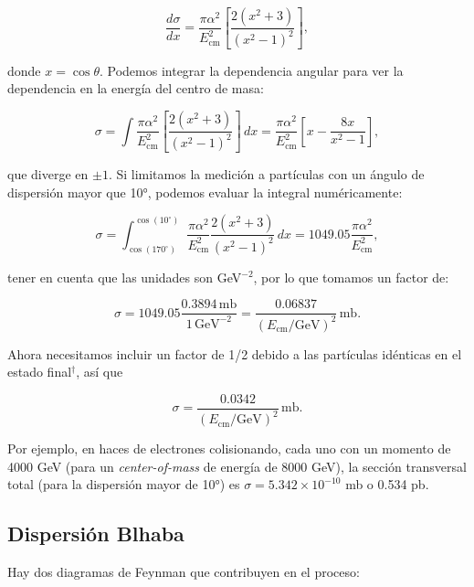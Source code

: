 \begin{equation}
\frac{d\sigma}{dx} = \frac{\pi \alpha^2}{E_{\text{cm}}^2} \left[ \frac{2 (x^2 + 3)}{(x^2 - 1)^2} \right],
\end{equation}

donde $x = \cos \theta$. Podemos integrar la dependencia angular para ver la dependencia en la energía del centro de masa:

\begin{equation}
\sigma = \int \frac{\pi \alpha^2}{E_{\text{cm}}^2} \left[ \frac{2 (x^2 + 3)}{(x^2 - 1)^2} \right] \, dx = \frac{\pi \alpha^2}{E_{\text{cm}}^2} \left[ x - \frac{8x}{x^2 - 1} \right],
\end{equation}

que diverge en $\pm 1$. Si limitamos la medición a partículas con un ángulo de dispersión mayor que 10°, podemos evaluar la integral numéricamente:

\begin{equation}
\sigma = \int_{\cos(170^\circ)}^{\cos(10^\circ)} \frac{\pi \alpha^2}{E_{\text{cm}}^2} \frac{2 (x^2 + 3)}{(x^2 - 1)^2} \, dx = 1049.05 \frac{\pi \alpha^2}{E_{\text{cm}}^2},
\end{equation}

tener en cuenta que las unidades son GeV$^{-2}$, por lo que tomamos un factor de:

\begin{equation}
\sigma = 1049.05 \frac{0.3894 \, \text{mb}}{1 \, \text{GeV}^{-2}} = \frac{0.06837}{(E_{\text{cm}}/\text{GeV})^2} \, \text{mb}.
\end{equation}

Ahora necesitamos incluir un factor de 1/2 debido a las partículas idénticas en el estado final$^\dagger$, así que

\begin{equation}
\sigma = \frac{0.0342}{(E_{\text{cm}}/\text{GeV})^2} \, \text{mb}.
\end{equation}

Por ejemplo, en haces de electrones colisionando, cada uno con un momento de 4000 GeV (para un \textsl{center-of-mass} de energía de 8000 GeV), la sección transversal total (para la dispersión mayor de 10°) es $\sigma = 5.342 \times 10^{-10}$ mb o 0.534 pb.


\subsection{Dispersión Blhaba}
Hay dos diagramas de Feynman que contribuyen en el proceso:

